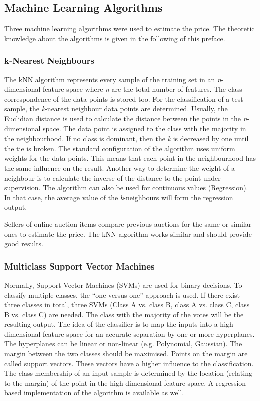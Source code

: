 \subsection{Machine Learning Algorithms}
Three machine learning algorithms were used to estimate the price. The theoretic knowledge about the algorithms is given in the following of this preface.
\subsubsection{k-Nearest Neighbours}
The kNN algorithm \cite{knn} represents every sample of the training set in an \textit{n}-dimensional feature space where \textit{n} are the total number of features. The class correspondence of the data points is stored too. For the classification of a test sample, the \textit{k}-nearest neighbour data points are determined. Usually, the Euclidian distance is used to calculate the distance between the points in the \textit{n}-dimensional space. The data point is assigned to the class with the majority in the neighbourhood. If no class is dominant, then the \textit{k} is decreased by one until the tie is broken. The standard configuration of the algorithm uses uniform weights for the data points. This means that each point in the neighbourhood has the same influence on the result. Another way to determine the weight of a neighbour is to calculate the inverse of the distance to the point under supervision. The algorithm can also be used for continuous values (Regression). In that case, the average value of the \textit{k}-neighbours will form the regression output.

Sellers of online auction items compare previous auctions for the same or similar ones to estimate the price. The kNN algorithm works similar and should provide good results. 
\subsubsection{Multiclass Support Vector Machines}
Normally, Support Vector Machines (SVMs)\cite{svc} are used for binary decisions. To classify multiple classes, the ``one-versus-one'' approach is used. If there exist three classes in total, three SVMs (Class A vs. class B, class A vs. class C, class B vs. class C) are needed. The class with the majority of the votes will be the resulting output. The idea of the classifier is to map the inputs into a high-dimensional feature space for an accurate separation by one or more hyperplanes. The hyperplanes can be linear or non-linear (e.g. Polynomial, Gaussian). The margin between the two classes should be maximised. Points on the margin are called support vectors. These vectors have a higher influence to the classification. The class membership of an input sample is determined by the location (relating to the margin) of the point in the high-dimensional feature space. A regression based implementation of the algorithm is available as well\cite{svr}.

